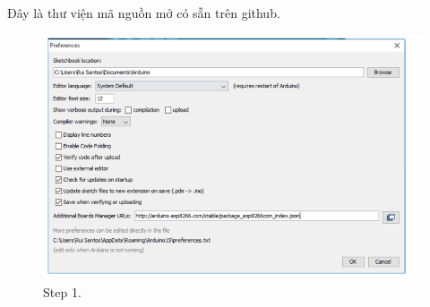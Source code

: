 \documentclass[a4paper,12pt,oneside]{article}
\begin{document}
\begin{itemize}
Đây là thư viện mã nguồn mở có sẵn trên github.\\
\begin{figure}[H]
\begin{center}
\includegraphics[scale=0.8]{hinh/caidatesp.png}
\end{center}
\caption{Step 1.}
\end{figure}


\end{itemize}
\end{document}
